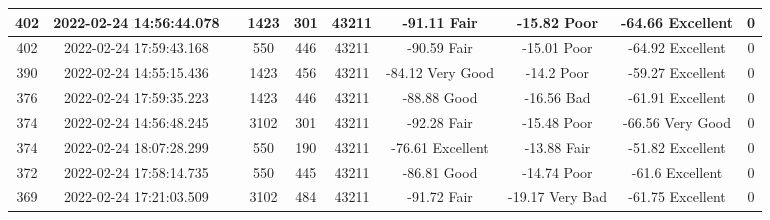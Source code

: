 \begin{longtable*}{|c|c|c|c|c|c|c|c|c|c|}
402&2022-02-24 14:56:44.078&&1423&301&43211& -91.11    Fair        & -15.82    Poor        & -64.66    Excellent   & 0\\\hline
{}402&2022-02-24 17:59:43.168&&550&446&43211& -90.59    Fair        & -15.01    Poor        & -64.92    Excellent   & 0\\\hline
{}390&2022-02-24 14:55:15.436&&1423&456&43211& -84.12    Very Good   & -14.2     Poor        & -59.27    Excellent   & 0\\\hline
{}376&2022-02-24 17:59:35.223&&1423&446&43211& -88.88    Good        & -16.56    Bad         & -61.91    Excellent   & 0\\\hline
{}374&2022-02-24 14:56:48.245&&3102&301&43211& -92.28    Fair        & -15.48    Poor        & -66.56    Very Good   & 0\\\hline
{}374&2022-02-24 18:07:28.299&&550&190&43211& -76.61    Excellent   & -13.88    Fair        & -51.82    Excellent   & 0\\\hline
{}372&2022-02-24 17:58:14.735&&550&445&43211& -86.81    Good        & -14.74    Poor        & -61.6     Excellent   & 0\\\hline
{}369&2022-02-24 17:21:03.509&&3102&484&43211& -91.72    Fair        & -19.17    Very Bad    & -61.75    Excellent   & 0\\\hline

\end{longtable*}
